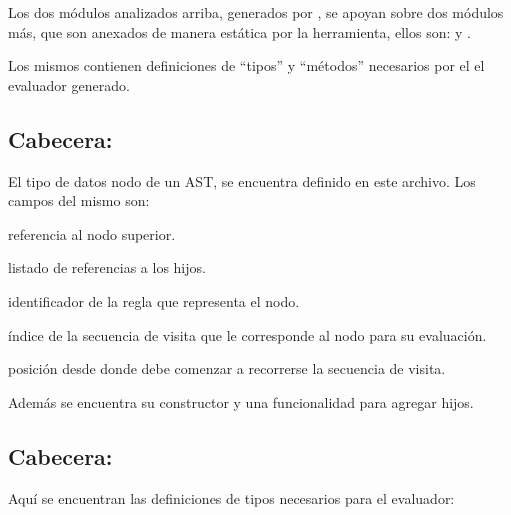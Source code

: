 Los dos módulos analizados arriba, generados por \maggen, se apoyan sobre dos módulos más, que son anexados de manera estática por la herramienta, ellos son:  y .

Los mismos contienen definiciones de ``tipos'' y ``métodos'' necesarios por el el evaluador generado.

\subsection{Cabecera: }

El tipo de datos nodo de un AST, se encuentra definido en este archivo. Los campos del mismo son:
\begin{items}
\item {} referencia al nodo superior.

\item {} listado de referencias a los hijos.

\item {} identificador de la regla que representa el nodo.

\item {} índice de la secuencia de visita que le corresponde al nodo para su evaluación.

\item {} posición desde donde debe comenzar a recorrerse la secuencia de visita.
\end{items}

Además se encuentra su constructor y una funcionalidad para agregar hijos.

\subsection{Cabecera: }

Aquí se encuentran las definiciones de tipos necesarios para el evaluador:

